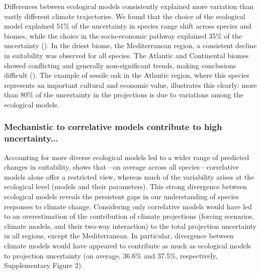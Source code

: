 \documentclass[11pt,letter]{article}
\begin{document}
Differences between ecological models consistently explained more variation than vastly different climate trajectories. We found that the choice of the ecological model explained 51\% of the uncertainty in species range shift across species and biomes, while the choice in the socio-economic pathway explained 35\% of the uncertainty (). In the driest biome, the Mediterranean region, a consistent decline in suitability was observed for all species. The Atlantic and Continental biomes showed conflicting and generally non-significant trends, making conclusions difficult (). The example of sessile oak in the Atlantic region, where this species represents an important cultural and economic value, illustrates this clearly: more than 80\% of the uncertainty in the projections is due to variations among the ecological models. 


\subsubsection*{Mechanistic to correlative models contribute to high uncertainty...}

Accounting for more diverse ecological models led to a wider range of predicted changes in suitability.  shows that---on average across all species---correlative models alone offer a restricted view, whereas much of the variability arises at the ecological level (models and their parameters). This strong divergence between ecological models reveals the persistent gaps in our understanding of species responses to climate change. Considering only correlative models would have led to an overestimation of the contribution of climate projections (forcing scenarios, climate models, and their two-way interaction) to the total projection uncertainty in all regions, except the Mediterranean. In particular, divergence between climate models would have appeared to contribute as much as ecological models to projection uncertainty (on average, 36.6\% and 37.5\%, respectively, Supplementary Figure 2). 
\end{document}
